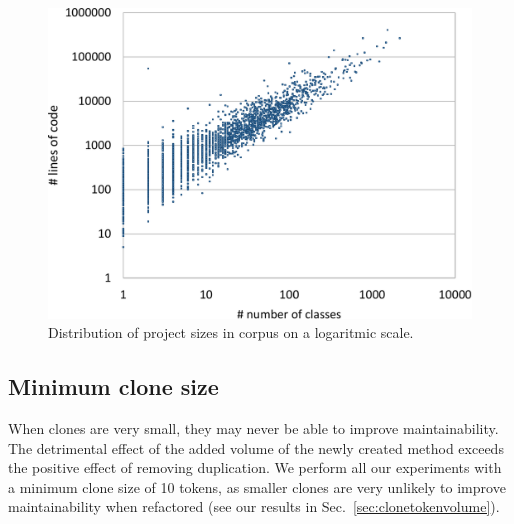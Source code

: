 \documentclass[a4paper,UKenglish,cleveref, autoref, thm-restate,authorcolumns]{lipics-v2019}
\begin{document}
\begin{figure}[H]
  \includegraphics[width=1\columnwidth]{img/dist2}
  \caption{Distribution of project sizes in corpus on a logaritmic scale.}
  \label{fig:dist}
\end{figure}


\subsection{Minimum clone size}
When clones are very small, they may never be able to improve maintainability. The detrimental effect of the added volume of the newly created method exceeds the positive effect of removing duplication. We perform all our experiments with a minimum clone size of 10 tokens, as smaller clones are very unlikely to improve maintainability when refactored (see our results in Sec.~\ref{sec:clonetokenvolume}).

\end{document}
